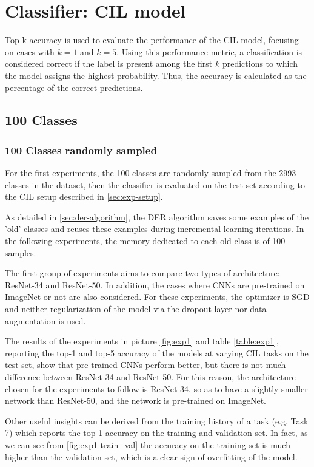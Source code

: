 \section{Classifier: CIL model}
\label{sec:exp-cil}
Top-k accuracy is used to evaluate the performance of the CIL model, focusing on cases with $k=1$ and $k=5$.
Using this performance metric, a classification is considered correct if the label is present among the first $k$ predictions to which the model assigns the highest probability. Thus, the accuracy is calculated as the percentage of the correct predictions.

\subsection{100 Classes}
\subsubsection{100 Classes randomly sampled}
For the first experiments, the 100 classes are randomly sampled from the 2993 classes in the dataset, then the classifier is evaluated on the test set according to the CIL setup described in \autoref{sec:exp-setup}. 

As detailed in \autoref{sec:der-algorithm}, the DER algorithm saves some examples of the 'old' classes and reuses these examples during incremental learning iterations. In the following experiments, the memory dedicated to each old class is of 100 samples.

The first group of experiments aims to compare two types of architecture: ResNet-34 and ResNet-50. In addition, the cases where CNNs are pre-trained on ImageNet or not are also considered. For these experiments, the optimizer is SGD and neither regularization of the model via the dropout layer nor data augmentation is used.

The results of the experiments in picture \autoref{fig:exp1} and table \autoref{table:exp1}, reporting the top-1 and top-5 accuracy of the models at varying CIL tasks on the test set, show that pre-trained CNNs perform better, but there is not much difference between ResNet-34 and ResNet-50. For this reason, the architecture chosen for the experiments to follow is ResNet-34, so as to have a slightly smaller network than ResNet-50, and the network is pre-trained on ImageNet.

Other useful insights can be derived from the training history of a task (e.g. Task 7) which reports the top-1 accuracy on the training and validation set. In fact, as we can see from \autoref{fig:exp1-train_val} the accuracy on the training set is much higher than the validation set, which is a clear sign of overfitting of the model.

